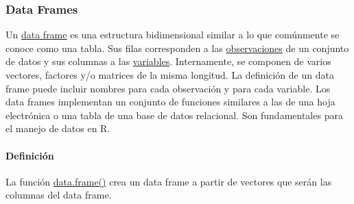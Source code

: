 \documentclass[
  letterpaper,
  DIV=11,
  numbers=noendperiod]{scrreprt}
\let\oldparagraph\paragraph
\renewcommand{\paragraph}[1]{\oldparagraph{#1}\mbox{}}
\begin{document}
\hypertarget{data-frames}{%
\subsubsection{Data Frames}\label{data-frames}}

Un
\href{https://cran.r-project.org/doc/manuals/r-release/R-lang.html\#Data-frame-objects}{data
frame} es una estructura bidimensional similar a lo que comúnmente se
conoce como una tabla. Sus filas corresponden a las
\href{https://es.wikipedia.org/wiki/Observaci\%C3\%B3n}{observaciones}
de un conjunto de datos y sus columnas a las
\href{https://es.wikipedia.org/wiki/Variable_estad\%C3\%ADstica}{variables}.
Internamente, se componen de varios vectores, factores y/o matrices de
la misma longitud. La definición de un data frame puede incluir nombres
para cada observación y para cada variable. Los data frames implementan
un conjunto de funciones similares a las de una hoja electrónica o una
tabla de una base de datos relacional. Son fundamentales para el manejo
de datos en R.

\hypertarget{definiciuxf3n-3}{%
\paragraph{Definición}\label{definiciuxf3n-3}}

La función \href{https://rdrr.io/r/base/data.frame.html}{data.frame()}
crea un data frame a partir de vectores que serán las columnas del data
frame.
\end{document}
